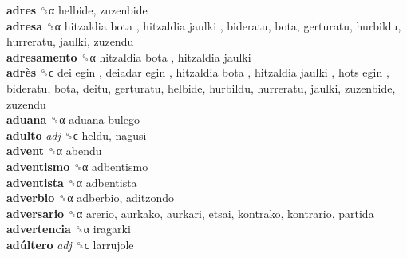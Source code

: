 \textbf{adres} ␝α  helbide, zuzenbide  \\
\textbf{adresa} ␝α   hitzaldia bota ,  hitzaldia jaulki , bideratu, bota, gerturatu, hurbildu, hurreratu, jaulki, zuzendu  \\
\textbf{adresamento} ␝α   hitzaldia bota ,  hitzaldia jaulki   \\
\textbf{adrès} ␝ϲ   dei egin ,  deiadar egin ,  hitzaldia bota ,  hitzaldia jaulki ,  hots egin , bideratu, bota, deitu, gerturatu, helbide, hurbildu, hurreratu, jaulki, zuzenbide, zuzendu  \\
\textbf{aduana} ␝α   aduana-bulego   \\
\textbf{adulto} \emph{adj}  ␝ϲ  heldu, nagusi  \\
\textbf{advent} ␝α  abendu  \\
\textbf{adventismo} ␝α  adbentismo  \\
\textbf{adventista} ␝α  adbentista  \\
\textbf{adverbio} ␝α  adberbio, aditzondo  \\
\textbf{adversario} ␝α  arerio, aurkako, aurkari, etsai, kontrako, kontrario, partida  \\
\textbf{advertencia} ␝α  iragarki  \\
\textbf{adúltero} \emph{adj}  ␝ϲ  larrujole  \\
